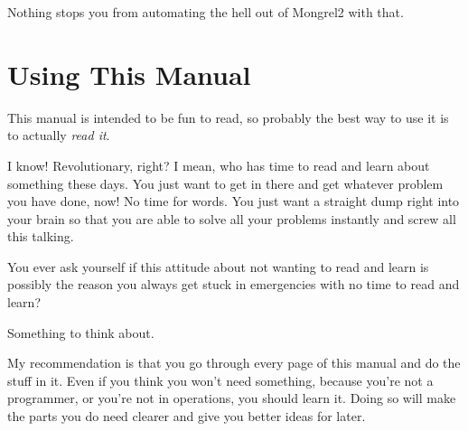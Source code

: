 Nothing stops you from automating the hell out of Mongrel2 with that.


\section{Using This Manual}

This manual is intended to be fun to read, so probably the best way to use it
is to actually \emph{read it}.

I know! Revolutionary, right?  I mean, who has time to read and learn about something
these days.  You just want to get in there and get whatever problem you have done,
now! No time for words.  You just want a straight dump right into your brain so
that you are able to solve all your problems instantly and screw all this talking.

You ever ask yourself if this attitude about not wanting to read and learn is
possibly the reason you always get stuck in emergencies with no time to read
and learn?

Something to think about.

My recommendation is that you go through every page of this manual and do the
stuff in it.  Even if you think you won't need something, because you're not
a programmer, or you're not in operations, you should learn it.  Doing so will
make the parts you do need clearer and give you better ideas for later.



